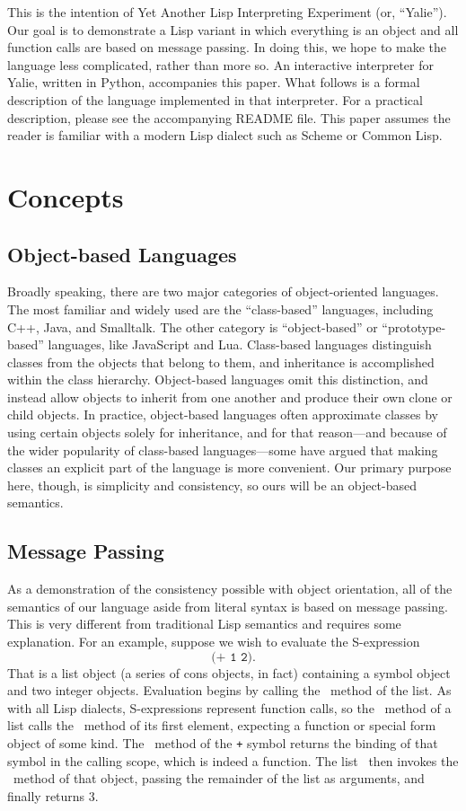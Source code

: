 \documentclass[twocolumn]{article}
\begin{document}
This is the intention of Yet Another Lisp Interpreting Experiment (or,
``Yalie''). Our goal is to demonstrate a Lisp variant in which
everything is an object and all function calls are based on message
passing. In doing this, we hope to make the language less complicated,
rather than more so. An interactive interpreter for Yalie, written in
Python, accompanies this paper. What follows is a formal description
of the language implemented in that interpreter.  For a practical
description, please see the accompanying README file. This paper
assumes the reader is familiar with a modern Lisp dialect such as
Scheme or Common Lisp.

\section*{Concepts}
\subsection*{Object-based Languages}
Broadly speaking, there are two major categories of object-oriented
languages\cite{Abadi}. The most familiar and widely used are the
``class-based'' languages, including C++, Java, and Smalltalk. The
other category is ``object-based'' or ``prototype-based'' languages,
like JavaScript and Lua. Class-based languages distinguish classes
from the objects that belong to them, and inheritance is accomplished
within the class hierarchy. Object-based languages omit this
distinction, and instead allow objects to inherit from one another and
produce their own clone or child objects. In practice, object-based
languages often approximate classes by using certain objects solely
for inheritance, and for that reason---and because of the wider
popularity of class-based languages---some have argued that making
classes an explicit part of the language is more
convenient\cite{Bruce}. Our primary purpose here, though, is
simplicity and consistency, so ours will be an object-based semantics.

\subsection*{Message Passing}
As a demonstration of the consistency possible with object
orientation, all of the semantics of our language aside from literal
syntax is based on message passing. This is very different from
traditional Lisp semantics and requires some explanation. For an
example, suppose we wish to evaluate the S-expression
\[ \texttt{(+ 1 2)}. \] That is a list object (a series of cons
objects, in fact) containing a symbol object and two integer
objects. Evaluation begins by calling the \eval\ method of the list. As
with all Lisp dialects, S-expressions represent function calls, so the
\eval\ method of a list calls the \eval\ method of its first element,
expecting a function or special form object of some kind. The \eval\
method of the \texttt{+} symbol returns the binding of that symbol in
the calling scope, which is indeed a function. The list \eval\ then
invokes the \call\ method of that object, passing the remainder of the
list as arguments, and finally returns $3$.
\end{document}
